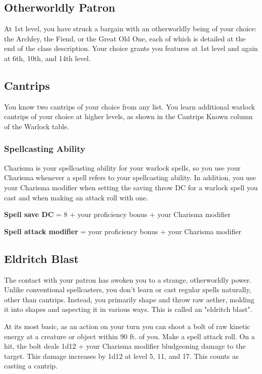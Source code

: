 \subsection{Otherworldly Patron}

At 1st level, you have struck a bargain with an otherworldly being of your choice: the Archfey, the Fiend, or the Great Old One, each of which is detailed at the end of the class description. Your choice grants you features at 1st level and again at 6th, 10th, and 14th level.

\subsection{Cantrips}

You know two cantrips of your choice from any list. You learn additional warlock cantrips of your choice at higher levels, as shown in the Cantrips Known column of the Warlock table.

\subsubsection{Spellcasting Ability}

Charisma is your spellcasting ability for your warlock spells, so you use your Charisma whenever a spell refers to your spellcasting ability. In addition, you use your Charisma modifier when setting the saving throw DC for a warlock spell you cast and when making an attack roll with one.

\textbf{Spell save DC} = 8 + your proficiency bonus + your Charisma modifier

\textbf{Spell attack modifier} = your proficiency bonus + your Charisma modifier

\subsection{Eldritch Blast}

The contact with your patron has awoken you to a strange, otherworldly power. Unlike conventional spellcasters, you don't learn or cast regular spells naturally, other than cantrips. Instead, you primarily shape and throw raw aether, molding it into shapes and aspecting it in various ways. This is called an "eldritch blast".

At its most basic, as an action on your turn you can shoot a bolt of raw kinetic energy at a creature or object within 90 ft. of you. Make a spell attack roll. On a hit, the bolt deals 1d12 + your Charisma modifier bludgeoning damage to the target. This damage increases by 1d12 at level 5, 11, and 17. This counts as casting a cantrip.

